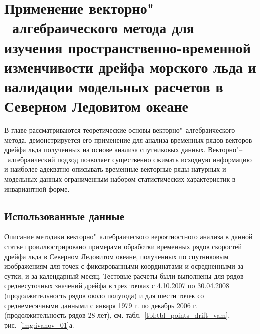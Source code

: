 \chapter{Применение векторно"--~алгебраического метода для изучения пространственно-временной изменчивости дрейфа морского льда и валидации модельных расчетов в Северном Ледовитом океане} \label{chapt3}

В главе рассматриваются теоретические основы векторно"~алгебраического метода, демонстрируется его применение для анализа временных рядов векторов дрейфа льда полученных на основе анализа спутниковых данных. Векторно"--~алгебраический подход позволяет существенно сжимать исходную информацию и наиболее адекватно описывать временные векторные ряды натурных и модельных данных ограниченным набором статистических характеристик в инвариантной форме.

\section{Использованные данные} \label{sect3_1}

Описание методики векторно"~алгебраического вероятностного анализа в данной статье проиллюстрировано примерами обработки временных рядов скоростей дрейфа льда в Северном Ледовитом океане, полученных по спутниковым изображениям для точек с фиксированными координатами и осредненными за сутки, и за календарный месяц. Тестовые расчеты были выполнены для рядов среднесуточных значений дрейфа в трех точках с 4.10.2007 по 30.04.2008 (продолжительность рядов около полугода) и для шести точек со среднемесячными данными с января 1979 г. по декабрь 2006 г. (продолжительность рядов 28 лет), см. табл.~\ref{tbl:tbl_points_drift_vam}, рис.~\ref{img:ivanov_01}а.

